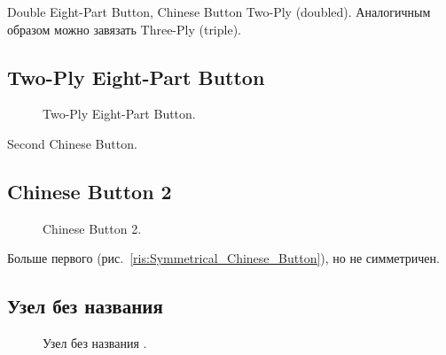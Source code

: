 Double Eight-Part Button, Chinese Button Two-Ply (doubled). Аналогичным образом можно завязать Three-Ply (triple).

\subsection{Two-Ply Eight-Part Button}

\begin{figure}[H]\centering
	\begin{minipage}{1\linewidth}
		\begin{center}
			\tcbox[enhanced jigsaw,colframe=black,opacityframe=0.5,opacityback=0.5]
			{\centering{}}
		\end{center}
	\end{minipage}
\caption{Two-Ply Eight-Part Button.}
\label{ris:Two-Ply_Eight-Part_Button}
\end{figure}

Second Chinese Button.

\subsection{Chinese Button 2}

\begin{figure}[H]\centering
	\begin{minipage}{1\linewidth}
		\begin{center}
			\tcbox[enhanced jigsaw,colframe=black,opacityframe=0.5,opacityback=0.5]
			{\centering{}}
		\end{center}
	\end{minipage}
\caption{Chinese Button 2.}
\label{ris:Chinese_Button_2}
\end{figure}

Больше первого (рис.~\ref{ris:Symmetrical_Chinese_Button}), но не симметричен.

\addtocounter{KnotNoName}{1}

\subsection{Узел без названия }

\begin{figure}[H]\centering
	\begin{minipage}{1\linewidth}
		\begin{center}
			\tcbox[enhanced jigsaw,colframe=black,opacityframe=0.5,opacityback=0.5]
			{\centering{}}
		\end{center}
	\end{minipage}
\caption{Узел без названия .}
\label{ris:KnotNoName_11}
\end{figure}

